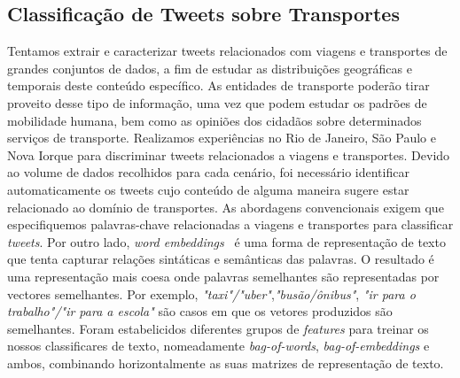 \documentclass[9pt,a4paper]{extarticle}
\begin{document}
\begin{multicols}{2}
\subsection{Classificação de Tweets sobre Transportes}
Tentamos extrair e caracterizar tweets relacionados com viagens e transportes de grandes conjuntos de dados, a fim de estudar as distribuições geográficas e temporais deste conteúdo específico. As entidades de transporte poderão tirar proveito desse tipo de informação, uma vez que podem estudar os padrões de  mobilidade humana, bem como as opiniões dos cidadãos sobre determinados serviços de transporte. Realizamos experiências no Rio de Janeiro, São Paulo e Nova Iorque para discriminar tweets relacionados a viagens e transportes. Devido ao volume de dados recolhidos para cada cenário, foi necessário identificar automaticamente os tweets cujo conteúdo de alguma maneira sugere estar relacionado ao domínio de transportes. As abordagens convencionais exigem que especifiquemos palavras-chave relacionadas a viagens e transportes para classificar \emph{tweets}. Por outro lado, \emph{word embeddings}~\cite{mikolov2013linguistic} é uma forma de representação de texto que tenta capturar relações sintáticas e semânticas das palavras. O resultado é uma representação mais coesa onde palavras semelhantes são representadas por vectores semelhantes. Por exemplo, \emph{"taxi"/"uber"},\emph{"busão/ônibus"}, \emph{"ir para o trabalho"/"ir para a escola"} são casos em que os vetores produzidos são semelhantes. Foram estabelicidos diferentes grupos de \emph{features} para treinar os nossos classificares de texto, nomeadamente \emph{bag-of-words}, \emph{bag-of-embeddings} e ambos, combinando horizontalmente as suas matrizes de representação de texto.


\end{multicols}
\end{document}
